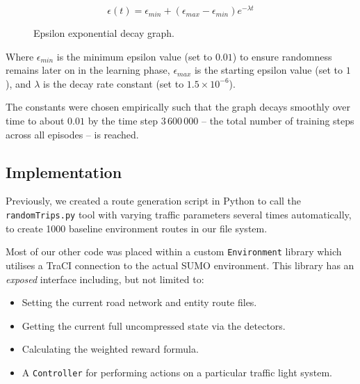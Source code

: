 \documentclass[a4paper]{report}
\begin{document}
\[
  \epsilon(t) = \epsilon_{min} + (\epsilon_{max}-\epsilon_{min}) e^{-\lambda t} 
\]


\begin{figure}[H]
  \centering
  \caption{Epsilon exponential decay graph.}
  \label{fig:epsilon_decay}
\end{figure}

Where $\epsilon_{min}$ is the minimum epsilon value (set to $0.01$) to ensure randomness remains later on in the learning phase, $\epsilon_{max}$ is the starting epsilon value (set to $1$), and $\lambda$ is the decay rate constant (set to $1.5\times10^{-6}$).

The constants were chosen empirically\footnotemark{} such that the graph decays smoothly over time to about $0.01$ by the time step $3\,600\,000$ -- the total number of training steps across all episodes -- is reached.

\subsection{Implementation}

Previously, we created a route generation script in Python to call the \texttt{randomTrips.py} tool with varying traffic parameters several times automatically, to create 1000 baseline environment routes in our file system.

Most of our other code was placed within a custom \texttt{Environment} library which utilises a TraCI connection to the actual SUMO environment. This library has an \emph{exposed} interface including, but not limited to:

\begin{itemize}
  \item Setting the current road network and entity route files.
  \item Getting the current full uncompressed state via the detectors.
  \item Calculating the weighted reward formula.
  \item A \texttt{Controller} for performing actions on a particular traffic light system.
\end{itemize}
\end{document}
